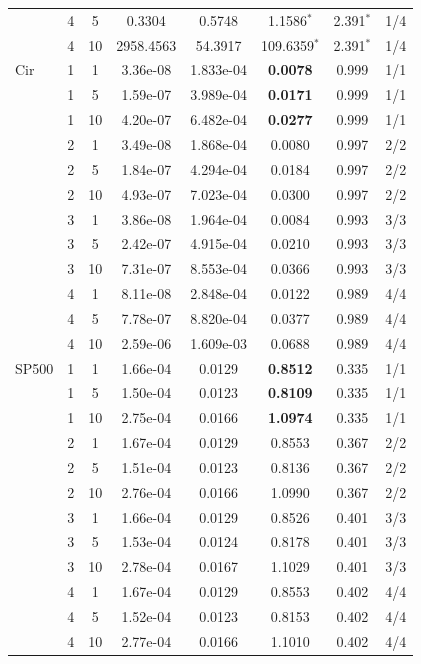 \begin{table}[h!]
\begin{tabular}{llcccccc}
 & 4 & 5 & 0.3304 & 0.5748 & 1.1586$^*$ & 2.391$^*$ & 1/4 \\
 & 4 & 10 & 2958.4563 & 54.3917 & 109.6359$^*$ & 2.391$^*$ & 1/4 \\
\midrule
Cir & 1 & 1 & 3.36e-08 & 1.833e-04 & \textbf{0.0078} & 0.999 & 1/1 \\
 & 1 & 5 & 1.59e-07 & 3.989e-04 & \textbf{0.0171} & 0.999 & 1/1 \\
 & 1 & 10 & 4.20e-07 & 6.482e-04 & \textbf{0.0277} & 0.999 & 1/1 \\
 & 2 & 1 & 3.49e-08 & 1.868e-04 & 0.0080 & 0.997 & 2/2 \\
 & 2 & 5 & 1.84e-07 & 4.294e-04 & 0.0184 & 0.997 & 2/2 \\
 & 2 & 10 & 4.93e-07 & 7.023e-04 & 0.0300 & 0.997 & 2/2 \\
 & 3 & 1 & 3.86e-08 & 1.964e-04 & 0.0084 & 0.993 & 3/3 \\
 & 3 & 5 & 2.42e-07 & 4.915e-04 & 0.0210 & 0.993 & 3/3 \\
 & 3 & 10 & 7.31e-07 & 8.553e-04 & 0.0366 & 0.993 & 3/3 \\
 & 4 & 1 & 8.11e-08 & 2.848e-04 & 0.0122 & 0.989 & 4/4 \\
 & 4 & 5 & 7.78e-07 & 8.820e-04 & 0.0377 & 0.989 & 4/4 \\
 & 4 & 10 & 2.59e-06 & 1.609e-03 & 0.0688 & 0.989 & 4/4 \\
\midrule
SP500 & 1 & 1 & 1.66e-04 & 0.0129 & \textbf{0.8512} & 0.335 & 1/1 \\
 & 1 & 5 & 1.50e-04 & 0.0123 & \textbf{0.8109} & 0.335 & 1/1 \\
 & 1 & 10 & 2.75e-04 & 0.0166 & \textbf{1.0974} & 0.335 & 1/1 \\
 & 2 & 1 & 1.67e-04 & 0.0129 & 0.8553 & 0.367 & 2/2 \\
 & 2 & 5 & 1.51e-04 & 0.0123 & 0.8136 & 0.367 & 2/2 \\
 & 2 & 10 & 2.76e-04 & 0.0166 & 1.0990 & 0.367 & 2/2 \\
 & 3 & 1 & 1.66e-04 & 0.0129 & 0.8526 & 0.401 & 3/3 \\
 & 3 & 5 & 1.53e-04 & 0.0124 & 0.8178 & 0.401 & 3/3 \\
 & 3 & 10 & 2.78e-04 & 0.0167 & 1.1029 & 0.401 & 3/3 \\
 & 4 & 1 & 1.67e-04 & 0.0129 & 0.8553 & 0.402 & 4/4 \\
 & 4 & 5 & 1.52e-04 & 0.0123 & 0.8153 & 0.402 & 4/4 \\
 & 4 & 10 & 2.77e-04 & 0.0166 & 1.1010 & 0.402 & 4/4 \\

\end{tabular}
\end{table}

